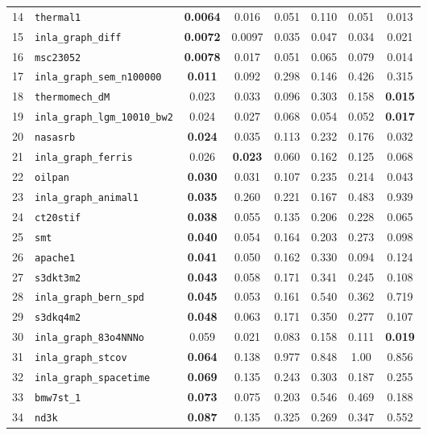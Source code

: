 \begin{footnotesize}
\begin{longtable}{rl cccccc}
14 & \texttt{thermal1} & \textbf{0.0064} & 0.016 & 0.051 & 0.110 & 0.051 & 0.013 \\
15 & \texttt{inla\_graph\_diff} & \textbf{0.0072} & 0.0097 & 0.035 & 0.047 & 0.034 & 0.021 \\
16 & \texttt{msc23052} & \textbf{0.0078} & 0.017 & 0.051 & 0.065 & 0.079 & 0.014 \\
17 & \texttt{inla\_graph\_sem\_n100000} & \textbf{0.011} & 0.092 & 0.298 & 0.146 & 0.426 & 0.315 \\
18 & \texttt{thermomech\_dM} & 0.023 & 0.033 & 0.096 & 0.303 & 0.158 & \textbf{0.015} \\
19 & \texttt{inla\_graph\_lgm\_10010\_bw2} & 0.024 & 0.027 & 0.068 & 0.054 & 0.052 & \textbf{0.017} \\
20 & \texttt{nasasrb} & \textbf{0.024} & 0.035 & 0.113 & 0.232 & 0.176 & 0.032 \\
21 & \texttt{inla\_graph\_ferris} & 0.026 & \textbf{0.023} & 0.060 & 0.162 & 0.125 & 0.068 \\
22 & \texttt{oilpan} & \textbf{0.030} & 0.031 & 0.107 & 0.235 & 0.214 & 0.043 \\
23 & \texttt{inla\_graph\_animal1} & \textbf{0.035} & 0.260 & 0.221 & 0.167 & 0.483 & 0.939 \\
24 & \texttt{ct20stif} & \textbf{0.038} & 0.055 & 0.135 & 0.206 & 0.228 & 0.065 \\
25 & \texttt{smt} & \textbf{0.040} & 0.054 & 0.164 & 0.203 & 0.273 & 0.098 \\
26 & \texttt{apache1} & \textbf{0.041} & 0.050 & 0.162 & 0.330 & 0.094 & 0.124 \\
27 & \texttt{s3dkt3m2} & \textbf{0.043} & 0.058 & 0.171 & 0.341 & 0.245 & 0.108 \\
28 & \texttt{inla\_graph\_bern\_spd} & \textbf{0.045} & 0.053 & 0.161 & 0.540 & 0.362 & 0.719 \\
29 & \texttt{s3dkq4m2} & \textbf{0.048} & 0.063 & 0.171 & 0.350 & 0.277 & 0.107 \\
30 & \texttt{inla\_graph\_83o4NNNo} & 0.059 & 0.021 & 0.083 & 0.158 & 0.111 & \textbf{0.019} \\
31 & \texttt{inla\_graph\_stcov} & \textbf{0.064} & 0.138 & 0.977 & 0.848 & 1.00 & 0.856 \\
32 & \texttt{inla\_graph\_spacetime} & \textbf{0.069} & 0.135 & 0.243 & 0.303 & 0.187 & 0.255 \\
33 & \texttt{bmw7st\_1} & \textbf{0.073} & 0.075 & 0.203 & 0.546 & 0.469 & 0.188 \\
34 & \texttt{nd3k} & \textbf{0.087} & 0.135 & 0.325 & 0.269 & 0.347 & 0.552 \\

\end{longtable}
\end{footnotesize}
